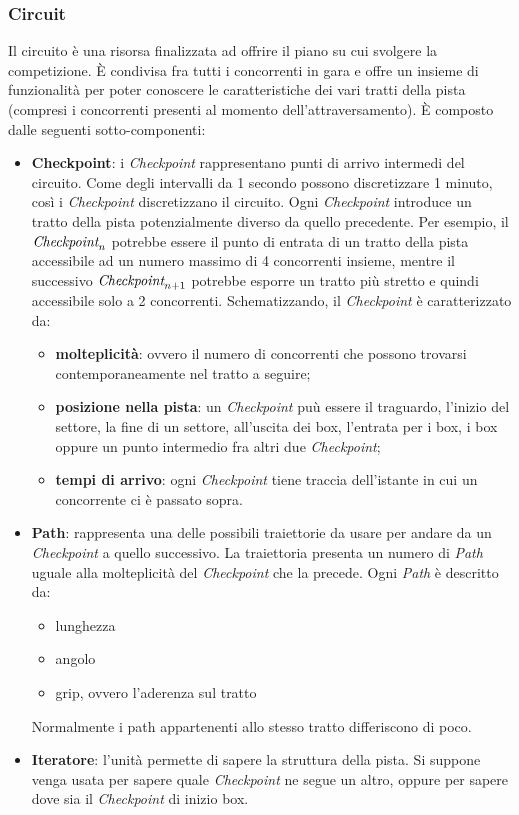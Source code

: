 \subsubsection{Circuit}
Il circuito \`{e} una risorsa finalizzata ad offrire il piano su cui svolgere la competizione. \`{E} condivisa fra tutti i concorrenti in gara e
offre un insieme di funzionalit\`{a} per poter conoscere le caratteristiche dei vari tratti della pista (compresi i concorrenti presenti
al momento dell'attraversamento). \`{E} composto dalle seguenti sotto-componenti:
\begin{itemize}
\item \textbf{Checkpoint}:
i \emph{Checkpoint} rappresentano punti di arrivo intermedi del circuito. Come degli intervalli da 1 secondo possono discretizzare 1 minuto,
cos\`{i} i \emph{Checkpoint} discretizzano il circuito. Ogni \emph{Checkpoint} introduce un tratto della pista potenzialmente diverso da quello precedente.
Per esempio, il $\emph{Checkpoint}_n$ potrebbe essere il punto di entrata di un tratto della pista accessibile ad un numero massimo di 4 concorrenti insieme,
mentre il successivo $\emph{Checkpoint}_{n+1}$ potrebbe esporre un tratto pi\`{u} stretto e quindi accessibile solo a 2 concorrenti. Schematizzando, 
il \emph{Checkpoint} \`{e} caratterizzato da:
\begin{itemize}
\item \textbf{molteplicit\`{a}}: ovvero il numero di concorrenti che possono trovarsi contemporaneamente nel tratto a seguire;
\item \textbf{posizione nella pista}: un \emph{Checkpoint} pu\`{u} essere il traguardo, l'inizio del settore, la fine di un settore, all'uscita dei box, l'entrata
					per i box, i box oppure un punto intermedio fra altri due \emph{Checkpoint};
\item \textbf{tempi di arrivo}: ogni \emph{Checkpoint} tiene traccia dell'istante in cui un concorrente ci \`{e} passato sopra.
\end{itemize}
\item \textbf{Path}: rappresenta una delle possibili traiettorie da usare per andare da un \emph{Checkpoint} a quello successivo. La traiettoria presenta
	un numero di \emph{Path} uguale alla molteplicit\`{a} del \emph{Checkpoint} che la precede. Ogni \emph{Path} \`{e} descritto da:
	\begin{itemize}
		\item lunghezza
		\item angolo
		\item grip, ovvero l'aderenza sul tratto
	\end{itemize}
Normalmente i path appartenenti allo stesso tratto differiscono di poco.
\item \textbf{Iteratore}: l'unit\`{a} permette di sapere la struttura della pista. Si suppone venga usata per sapere quale \emph{Checkpoint} ne segue un altro,
	oppure per sapere dove sia il \emph{Checkpoint} di inizio box. 
\end{itemize}

